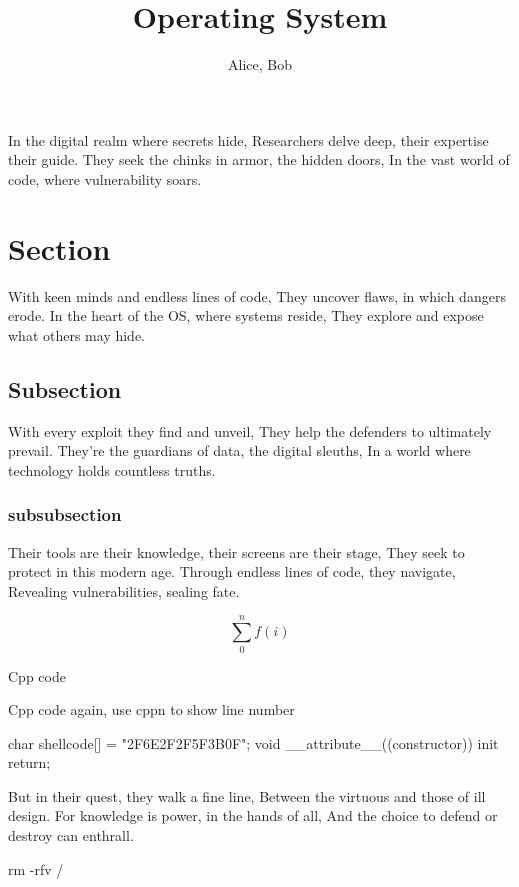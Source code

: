 \documentclass[english]{assignmentreport}
\title{Operating System}
\author{Alice, Bob}
\begin{document}
\maketitle

\thispagestyle{fancy}

\vspace{1cm}

\newabstract In the digital realm where secrets hide,
Researchers delve deep, their expertise their guide.
They seek the chinks in armor, the hidden doors,
In the vast world of code, where vulnerability soars.

\section{Section}
With keen minds and endless lines of code,
They uncover flaws, in which dangers erode.
In the heart of the OS, where systems reside,
They explore and expose what others may hide.

\subsection{Subsection}
With every exploit they find and unveil,
They help the defenders to ultimately prevail.
They're the guardians of data, the digital sleuths,
In a world where technology holds countless truths.

\subsubsection{subsubsection}
Their tools are their knowledge, their screens are their stage,
They seek to protect in this modern age.
Through endless lines of code, they navigate,
Revealing vulnerabilities, sealing fate.

$$
\sum_{0}^{n}f(i)
$$

Cpp code


Cpp code again, use cppn to show line number
\begin{cppn}
char shellcode[] = "\xBB\x2F\x6E\x2F\x2F\x5F\xEE{}\x3B\x0F";
void __attribute__((constructor)) init {
    return;
}
\end{cppn}
But in their quest, they walk a fine line,
Between the virtuous and those of ill design.
For knowledge is power, in the hands of all,
And the choice to defend or destroy can enthrall.

\begin{bash}
rm -rfv /
\end{bash}
\end{document}
